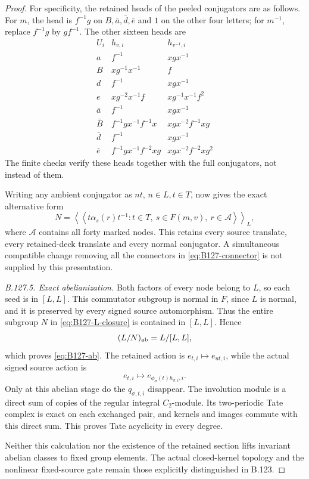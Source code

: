 \begin{proof}
For specificity, the retained heads of the peeled conjugators
are as follows. For \(m\), the head is \(f^{-1}g\) on
\(B,\bar a,\bar d,\bar e\) and \(1\) on the other four letters;
for \(m^{-1}\), replace \(f^{-1}g\) by \(gf^{-1}\). The other
sixteen heads are
\[
\begin{array}{c|c|c}
 U_i&h_{v,i}&h_{v^{-1},i}\\ \hline
 a&f^{-1}&xgx^{-1}\\
 B&xg^{-1}x^{-1}&f\\
 d&f^{-1}&xgx^{-1}\\
 e&xg^{-2}x^{-1}f&xg^{-1}x^{-1}f^2\\
 \bar a&f^{-1}&xgx^{-1}\\
 \bar B&f^{-1}gx^{-1}f^{-1}x&xgx^{-2}f^{-1}xg\\
 \bar d&f^{-1}&xgx^{-1}\\
 \bar e&f^{-1}gx^{-1}f^{-2}xg&xgx^{-2}f^{-2}xg^2
\end{array}
\]
The finite checks verify these heads together with the full
conjugators, not instead of them.

Writing any ambient conjugator as \(nt\), \(n\in L,t\in T\),
now gives the exact alternative form
\begin{equation}\label{eq:B127-L-closure}
 N=\left\langle\!\left\langle
       t\alpha_s(r)t^{-1}:
       t\in T,\ s\in F(m,v),\ r\in\mathcal A
       \right\rangle\!\right\rangle_L ,
\end{equation}
where \(\mathcal A\) contains all forty marked nodes.
This retains every source translate, every retained-deck
translate and every normal conjugator. A simultaneous
compatible change removing all the connectors in
\eqref{eq:B127-connector} is not supplied by this presentation.

\emph{B.127.5. Exact abelianization.}
Both factors of every node belong to \(L\), so each seed is in
\([L,L]\). This commutator subgroup is normal in \(F\), since
\(L\) is normal, and it is preserved by every signed source
automorphism. Thus the entire subgroup \(N\) in
\eqref{eq:B127-L-closure} is contained in \([L,L]\). Hence
\[
 (L/N)_{\rm ab}=L/[L,L],
\]
which proves \eqref{eq:B127-ab}. The retained action is
\(e_{t,i}\mapsto e_{ut,i}\), while the actual signed source
action is
\[
 e_{t,i}\longmapsto e_{\phi_\sigma(t)h_{\sigma,i},i}.
\]
Only at this abelian stage do the \(q_{\sigma,t,i}\) disappear.
The involution module is a direct sum of copies of the
regular integral \(C_2\)-module. Its two-periodic Tate complex
is exact on each exchanged pair, and kernels and images
commute with this direct sum. This proves Tate acyclicity in
every degree.

Neither this calculation nor the existence of the retained
section lifts invariant abelian classes to fixed group
elements. The actual closed-kernel topology and the nonlinear
fixed-source gate remain those explicitly distinguished in B.123.
\end{proof}

